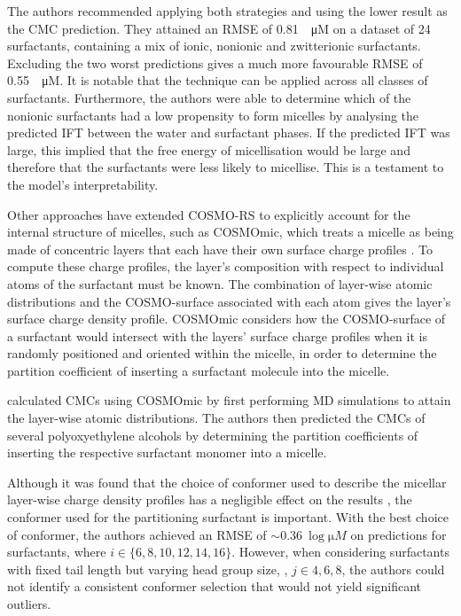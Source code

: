 The authors recommended applying both strategies and using the lower result as
the CMC prediction. They attained an RMSE of \SI{0.81}{\log \micro M} on a
dataset of 24 surfactants, containing a mix of ionic, nonionic and zwitterionic
surfactants. Excluding the two worst predictions gives a much more favourable
RMSE of \SI{0.55}{\log \micro M}. It is notable that the technique can be
applied across all classes of surfactants. Furthermore, the authors were able to
determine which of the nonionic surfactants had a low propensity to form
micelles by analysing the predicted IFT between the water and surfactant phases.
If the predicted IFT was large, this implied that the free energy of
micellisation would be large and therefore that the surfactants were less likely
to micellise. This is a testament to the model's interpretability.

Other approaches have extended COSMO-RS to explicitly account for the internal
structure of micelles, such as COSMOmic, which treats a micelle as being made of
concentric layers that each have their own surface charge profiles
\cite{klamtCOSMOmicMechanisticApproach2008}. To compute these charge profiles,
the layer's composition with respect to individual atoms of the surfactant must
be known. The combination of layer-wise atomic distributions and the
COSMO-surface associated with each atom gives the layer's surface charge density
profile. COSMOmic considers how the COSMO-surface of a surfactant would
intersect with the layers' surface charge profiles when it is randomly
positioned and oriented within the micelle, in order to determine the partition
coefficient of inserting a surfactant molecule into the micelle.

\citet{jakobtorweihenPredictingCriticalMicelle2017} calculated CMCs using
COSMOmic by first performing MD simulations to attain the layer-wise atomic
distributions. The authors then predicted the CMCs of several polyoxyethylene
alcohols by determining the partition coefficients of inserting the respective
surfactant monomer into a micelle.

Although it was found that the choice of conformer used to describe the micellar
layer-wise charge density profiles has a negligible effect on the results
\cite{jakobtorweihenCombinationCOSMOmicMolecular2013}, the conformer used for
the partitioning surfactant is important. With the best choice of conformer, the
authors achieved an RMSE of $\sim \SI{0.36}{\log \micro M}$ on predictions for
 surfactants, where $i \in \{6, 8, 10, 12, 14, 16\}$. However, when
considering surfactants with fixed tail length but varying head group size,
, $j \in {4, 6, 8}$, the authors could not identify a consistent
conformer selection that would not yield significant outliers.

